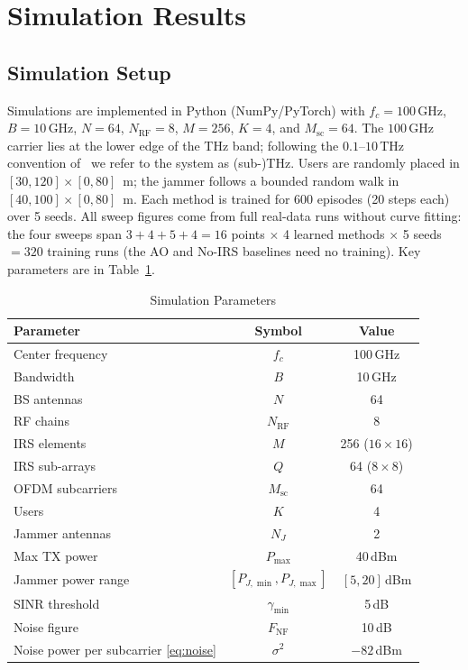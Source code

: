 \documentclass[10pt,conference]{IEEEtran}
\begin{document}
\section{Simulation Results}
\label{sec:results}

\subsection{Simulation Setup}

Simulations are implemented in Python (NumPy/PyTorch) with $f_c = 100\,\text{GHz}$, $B = 10\,\text{GHz}$, $N=64$, $N_{\mathrm{RF}}=8$, $M=256$, $K=4$, and $M_{\mathrm{sc}}=64$. The $100$\,GHz carrier lies at the lower edge of the THz band; following the $0.1$--$10$\,THz convention of~\cite{akyildiz2022thz} we refer to the system as (sub-)THz. Users are randomly placed in $[30,120]\!\times\![0,80]$~m; the jammer follows a bounded random walk in $[40,100]\!\times\![0,80]$~m. Each method is trained for 600 episodes (20 steps each) over 5 seeds. All sweep figures come from full real-data runs without curve fitting: the four sweeps span $3+4+5+4=16$ points $\times$ 4 learned methods $\times$ 5 seeds $= 320$ training runs (the AO and No-IRS baselines need no training). Key parameters are in Table~\ref{tab:params}.

\begin{table}[t]
\centering
\caption{Simulation Parameters}
\label{tab:params}
\begin{tabular}{lcc}
\toprule
\textbf{Parameter} & \textbf{Symbol} & \textbf{Value} \\
\midrule
Center frequency & $f_c$ & 100\,GHz \\
Bandwidth & $B$ & 10\,GHz \\
BS antennas & $N$ & 64 \\
RF chains & $N_{\text{RF}}$ & 8 \\
IRS elements & $M$ & 256 ($16 \times 16$) \\
IRS sub-arrays & $Q$ & 64 ($8 \times 8$) \\
OFDM subcarriers & $M_{\text{sc}}$ & 64 \\
Users & $K$ & 4 \\
Jammer antennas & $N_J$ & 2 \\
Max TX power & $P_{\max}$ & 40\,dBm \\
Jammer power range & $[P_{J,\min}, P_{J,\max}]$ & $[5, 20]$\,dBm \\
SINR threshold & $\gamma_{\min}$ & 5\,dB \\
Noise figure & $F_{\text{NF}}$ & 10\,dB \\
Noise power per subcarrier \eqref{eq:noise} & $\sigma^2$ & $-82$\,dBm \\
\bottomrule
\end{tabular}
\end{table}
\end{document}
